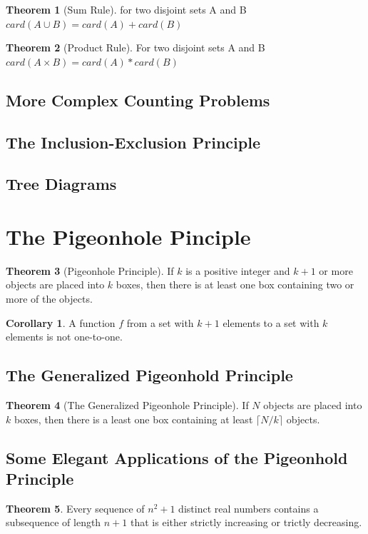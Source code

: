 \documentclass[11pt]{book} %
\theoremstyle {definition}
\newtheorem {theorem}{Theorem}[section]
\newtheorem {corollary}{Corollary}[section]
\theoremstyle {remark}
\begin{document}
\begin{theorem}[Sum Rule]
 for two disjoint sets A and B
$card(A \cup B) = card(A) + card(B)$
\end {theorem}


\begin{theorem}[Product Rule]
For two disjoint sets A and B
$card(A \times B) = card(A) * card(B)$
\end{theorem}

    \subsection {More Complex Counting Problems}
    \subsection {The Inclusion-Exclusion Principle}
    \subsection {Tree Diagrams}

\section {The Pigeonhole Pinciple}
\begin{theorem}[Pigeonhole Principle]
If $k$ is a positive integer and $k+1$ or more objects are placed into $k$ boxes, then there is at least one box containing two or more of the objects.
\end{theorem}

\begin{corollary}
A function $f$ from a set with $k+1$ elements to a set with $k$ elements is not one-to-one.
\end{corollary}


    \subsection {The Generalized Pigeonhold Principle}
\begin{theorem}[The Generalized Pigeonhole Principle]
If $N$ objects are placed into $k$ boxes, then there is a least one box containing at least $\lceil N/k \rceil$ objects.
\end{theorem}

    \subsection {Some Elegant Applications of the Pigeonhold Principle}
\begin{theorem}
Every sequence of $n^2 + 1$ distinct real numbers contains a subsequence of length $n+1$ that is either strictly increasing or trictly decreasing.
\end{theorem}
\end{document}
